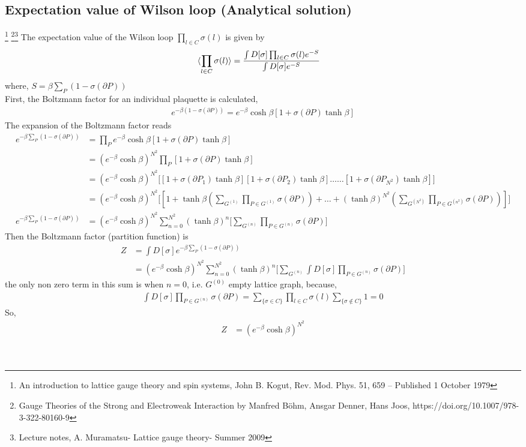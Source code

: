 \documentclass{article}
\begin{document}
\subsection{Expectation value of Wilson loop (Analytical solution)} \footnote{An introduction to lattice gauge theory and spin systems, John B. Kogut, Rev. Mod. Phys. 51, 659 – Published 1 October 1979} \footnote{ Gauge Theories of the Strong and Electroweak Interaction by Manfred Böhm, Ansgar Denner, Hans Joos, https://doi.org/10.1007/978-3-322-80160-9}\footnote{Lecture notes, A. Muramatsu- Lattice gauge theory- Summer 2009}
The expectation value of the Wilson loop $\prod_{l\in C} \sigma(l)$ is given by
\begin{align}
    \braket{\prod_{l\in C} \sigma(l)}&=\frac{\int D[\sigma]\prod_{l\in C}\sigma(l)e^{-S}}{\int D[\sigma]e^{-S}}
\end{align}
where, $S=\beta\sum_{P}(1-\sigma(\partial P))$\\
First, the Boltzmann factor for an individual plaquette is calculated, 
\begin{align}
    e^{-\beta(1-\sigma(\partial P))}=e^{-\beta}\cosh{\beta}[1+\sigma(\partial P)\tanh{\beta}]
\end{align}
The expansion of the Boltzmann factor reads 
\begin{align}
    e^{-\beta\sum_{P}(1-\sigma(\partial P))}&=\prod_{P}e^{-\beta}\cosh{\beta}[1+\sigma(\partial P)\tanh{\beta}]\\
    &=(e^{-\beta}\cosh{\beta})^{N^2}\prod_{P}[1+\sigma(\partial P)\tanh{\beta}]\\
    &=(e^{-\beta}\cosh{\beta})^{N^2}\Bigg[[1+\sigma(\partial P_1)\tanh{\beta}][1+\sigma(\partial P_2)\tanh{\beta}]\dots\dots[1+\sigma(\partial P_{N^2})\tanh{\beta}]\Bigg]\\
    &=(e^{-\beta}\cosh{\beta})^{N^2}\Bigg[[1+\tanh{\beta}\left(\sum_{G^{(1)}}\prod_{P\in G^{(1)}}\sigma(\partial P)\right)+\dots+(\tanh{\beta})^{N^2}\left(\sum_{G^{(N^2)}}\prod_{P\in G^{(n^2)}}\sigma(\partial P)\right)]\Bigg]\nonumber\\
    e^{-\beta\sum_{P}(1-\sigma(\partial P))}&=(e^{-\beta}\cosh{\beta})^{N^2}\sum_{n=0}^{N^2}(\tanh{\beta})^{n}\Bigg[\sum_{G^{(n)}}\prod_{P\in G^{(n)}}\sigma(\partial P)\Bigg]
\end{align}
Then the Boltzmann
factor (partition function) is
\begin{align}
    Z &=  \int D[\sigma]e^{-\beta\sum_{P}(1-\sigma(\partial P))}\\
    &=(e^{-\beta}\cosh{\beta})^{N^2}\sum_{n=0}^{N^2}(\tanh{\beta})^{n}\Bigg[\sum_{G^{(n)}}\int D[\sigma]\prod_{P\in G^{(n)}}\sigma(\partial P)\Bigg]
\end{align}
the only non zero term in this sum is when $n=0$, i.e. $G^{(0)}$ empty lattice graph, because,
\begin{align}
    \int D[\sigma]\prod_{P\in G^{(n)}}\sigma(\partial P) = \sum_{\{\sigma \in C\}}\prod_{l\in C}\sigma(l)\sum_{\{\sigma\notin C\}}1 = 0
\end{align}
So,
\begin{align}
Z&=(e^{-\beta}\cosh{\beta})^{N^2}
\end{align}
\\
\\
\end{document}
